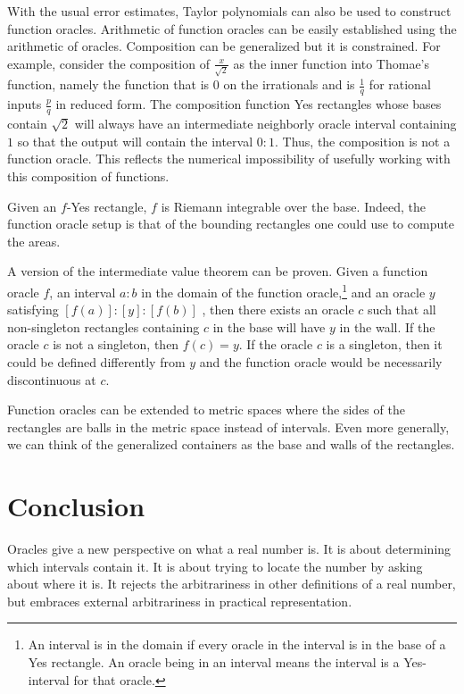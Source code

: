 \documentclass[12pt]{article}
\begin{document}
With the usual error estimates, Taylor polynomials can also be used to construct function oracles. Arithmetic of function oracles can be easily established using the arithmetic of oracles. Composition can be generalized but it is constrained. For example, consider the composition of $\frac{x}{\sqrt{2}}$ as the inner function into Thomae's function, namely the function that is 0 on the irrationals and is $\frac{1}{q}$ for rational inputs $\frac{p}{q}$ in reduced form. The composition function Yes rectangles whose bases contain $\sqrt{2}$ will always have an intermediate neighborly oracle interval containing $1$ so that the output will contain the interval $0:1$. Thus, the composition is not a function oracle. This reflects the numerical impossibility of usefully working with this composition of functions.

Given an $f$-Yes rectangle, $f$ is Riemann integrable over the base. Indeed, the function oracle setup is that of the bounding rectangles one could use to compute the areas. 

A version of the intermediate value theorem can be proven. Given a function oracle $f$, an interval $a:b$ in the domain of the function oracle,\footnote{An interval is in the domain if every oracle in the interval is in the base of a Yes rectangle. An oracle being in an interval means the interval is a Yes-interval for that oracle.} and an oracle $y$ satisfying $[f(a)]:[y]:[f(b)]$ , then there exists an oracle $c$ such that all non-singleton rectangles containing $c$ in the base will have $y$ in the wall. If the oracle $c$ is not a singleton, then $f(c) = y$. If the oracle $c$ is a singleton, then it could be defined differently from $y$ and the function oracle would be necessarily discontinuous at $c$. 

Function oracles can be extended to metric spaces where the sides of the rectangles are balls in the metric space instead of intervals. Even more generally, we can think of the generalized containers as the base and walls of the rectangles. 

\section{Conclusion}

Oracles give a new perspective on what a real number is. It is about determining which intervals contain it. It is about trying to locate the number by asking about where it is. It rejects the arbitrariness in other definitions of a real number, but embraces external arbitrariness in practical representation.
\end{document}

